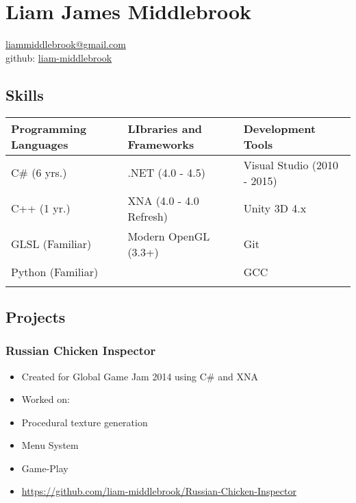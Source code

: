 \documentclass[line,margin]{res}
\begin{document}
\marginsize{.25in}{.25in}{.25in}{.25in}

\section{Liam James Middlebrook}

\href{mailto:liammiddlebrook@gmail.com}{liammiddlebrook@gmail.com}\\
github: \href{https://github.com/liam-middlebrook}{liam-middlebrook}

\subsection{Skills}
\begin{table}[h]
\begin{tabular}{@{}lll@{}}
\toprule
Programming Languages & LIbraries and Frameworks & Development Tools           \\ \midrule
C\# (6 yrs.)          & .NET (4.0 - 4.5)         & Visual Studio (2010 - 2015) \\
C++ (1 yr.)           & XNA (4.0 - 4.0 Refresh)  & Unity 3D 4.x                \\
GLSL (Familiar)       & Modern OpenGL (3.3+)     & Git                         \\
Python (Familiar)     &                          & GCC                         \\
                      &                          &                             \\ \bottomrule
\end{tabular}
\end{table}
\subsection{Projects}
\subsubsection{Russian Chicken
Inspector}
\begin{itemize}
\itemsep1pt\parskip0pt
\item
  Created for Global Game Jam 2014 using C\# and XNA
\item
  Worked on:
\item
  Procedural texture generation
\item
  Menu System
\item
  Game-Play
\item
  \url{https://github.com/liam-middlebrook/Russian-Chicken-Inspector}
\end{itemize}
\end{document}
